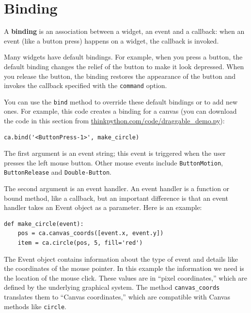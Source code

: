 \documentclass[10pt]{book}
\begin{document}
\section{Binding}


A {\bf binding} is an association between a widget, an event and a
callback: when an event (like a button press) happens on a widget, the
callback is invoked.

Many widgets have default bindings.  For example, when you press
a button, the default binding changes the relief of the button
to make it look depressed.  When you release the button, the
binding restores the appearance of the button and invokes the
callback specified with the {\tt command} option.

You can use the {\tt bind} method to override these default
bindings or to add new ones.  For example, this code creates a
binding for a canvas (you can download the code in this
section from \url{thinkpython.com/code/draggable_demo.py}):

\beforeverb
\begin{verbatim}
ca.bind('<ButtonPress-1>', make_circle)
\end{verbatim}
\afterverb
%
The first argument is an event string; this event is triggered
when the user presses the left mouse button.  Other mouse
events include {\tt ButtonMotion}, {\tt ButtonRelease} and
{\tt Double-Button}.


The second argument is an event handler.  An event handler
is a function or bound method, like a callback, but an important
difference is that an event handler takes an Event object as a
parameter.  Here is an example:

\beforeverb
\begin{verbatim}
def make_circle(event):
    pos = ca.canvas_coords([event.x, event.y])
    item = ca.circle(pos, 5, fill='red')
\end{verbatim}
\afterverb
%
The Event object contains information about the type of event and
details like the coordinates of the mouse pointer.  In this example
the information we need is
the location of the mouse click.  These
values are in ``pixel coordinates,'' which are defined by the
underlying graphical system.  The method \verb"canvas_coords"
translates them to ``Canvas coordinates,'' which are compatible with
Canvas methods like {\tt circle}.

\end{document}
